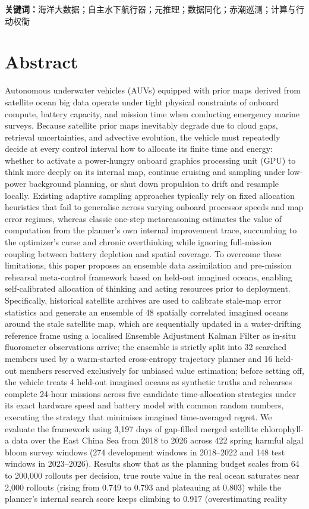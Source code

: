 \vspace{1em}
\noindent\textbf{关键词：}海洋大数据；自主水下航行器；元推理；数据同化；赤潮巡测；计算与行动权衡

\clearpage
\section*{Abstract}

Autonomous underwater vehicles (AUVs) equipped with prior maps derived from satellite ocean big data operate under tight physical constraints of onboard compute, battery capacity, and mission time when conducting emergency marine surveys. Because satellite prior maps inevitably degrade due to cloud gaps, retrieval uncertainties, and advective evolution, the vehicle must repeatedly decide at every control interval how to allocate its finite time and energy: whether to activate a power-hungry onboard graphics processing unit (GPU) to think more deeply on its internal map, continue cruising and sampling under low-power background planning, or shut down propulsion to drift and resample locally. Existing adaptive sampling approaches typically rely on fixed allocation heuristics that fail to generalise across varying onboard processor speeds and map error regimes, whereas classic one-step metareasoning estimates the value of computation from the planner's own internal improvement trace, succumbing to the optimizer's curse and chronic overthinking while ignoring full-mission coupling between battery depletion and spatial coverage. To overcome these limitations, this paper proposes an ensemble data assimilation and pre-mission rehearsal meta-control framework based on held-out imagined oceans, enabling self-calibrated allocation of thinking and acting resources prior to deployment. Specifically, historical satellite archives are used to calibrate stale-map error statistics and generate an ensemble of 48 spatially correlated imagined oceans around the stale satellite map, which are sequentially updated in a water-drifting reference frame using a localised Ensemble Adjustment Kalman Filter as in-situ fluorometer observations arrive; the ensemble is strictly split into 32 searched members used by a warm-started cross-entropy trajectory planner and 16 held-out members reserved exclusively for unbiased value estimation; before setting off, the vehicle treats 4 held-out imagined oceans as synthetic truths and rehearses complete 24-hour missions across five candidate time-allocation strategies under its exact hardware speed and battery model with common random numbers, executing the strategy that minimises imagined time-averaged regret. We evaluate the framework using 3,197 days of gap-filled merged satellite chlorophyll-a data over the East China Sea from 2018 to 2026 across 422 spring harmful algal bloom survey windows (274 development windows in 2018--2022 and 148 test windows in 2023--2026). Results show that as the planning budget scales from 64 to 200,000 rollouts per decision, true route value in the real ocean saturates near 2,000 rollouts (rising from 0.749 to 0.793 and plateauing at 0.803) while the planner's internal search score keeps climbing to 0.917 (overestimating reality 